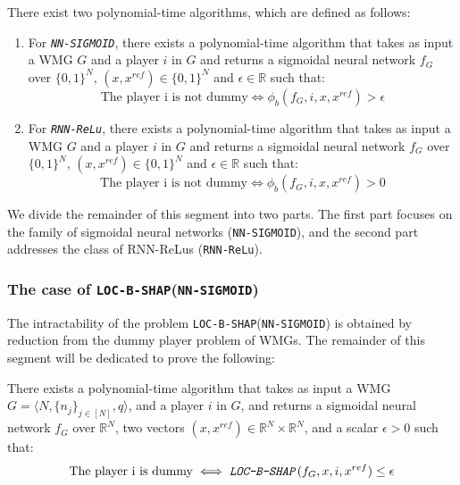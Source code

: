\begin{unumberedproposition} There exist two polynomial-time algorithms, which are defined as follows:
 \begin{enumerate}
        \item For \texttt{\emph{NN-SIGMOID}}, there exists a polynomial-time algorithm that takes as input a WMG $G$ and a player $i$ in $G$ and returns a sigmoidal neural network $f_{G}$ over $\{0,1\}^{N}$, $(x,x^{ref}) \in \{0,1\}^{N}$ and $\epsilon \in \mathbb{R}$ such that:
        $$\text{The player i is not dummy} \iff \phi_{b}(f_{G},i,x,x^{ref}) > \epsilon$$
        \item For \texttt{\emph{RNN-ReLu}}, there exists a polynomial-time algorithm that takes as input a WMG $G$ and a player $i$ in $G$ and returns a sigmoidal neural network $f_{G}$ over $\{0,1\}^{N}$, $(x,x^{ref}) \in \{0,1\}^{N}$ and $\epsilon \in \mathbb{R}$ such that:
         $$\text{The player i is not dummy} \iff \phi_{b}(f_{G},i,x,x^{ref}) > 0$$
    \end{enumerate}
\end{unumberedproposition}

We divide the remainder of this segment into two parts. The first part focuses on the family of sigmoidal neural networks (\texttt{NN-SIGMOID}), and the second part addresses the class of RNN-ReLus (\texttt{RNN-ReLu}).

\subsubsection{The case of \texttt{LOC-B-SHAP}(\texttt{NN-SIGMOID})}
The intractability of the problem \texttt{LOC-B-SHAP}(\texttt{NN-SIGMOID}) is obtained by reduction from the dummy player problem of WMGs. The remainder of this segment will be dedicated to prove the following:
\begin{proposition} \label{app:prop:bshapsigmoid}
    There exists a polynomial-time algorithm that takes as input a WMG $G = \langle N, \{n_{j}\}_{j \in [N]}, q \rangle$, and a player $i$ in $G$, and returns a sigmoidal neural network $f_{G}$ over $\mathbb{R}^{N}$, two vectors $(x, x^{ref}) \in \mathbb{R}^{N} \times \mathbb{R}^{N}$, and a scalar $\epsilon > 0$ such that:
    \begin{equation*}
     \text{The player i is dummy} \iff \texttt{\emph{LOC-B-SHAP}}(f_{G},x,i,x^{ref}) \leq \epsilon   
    \end{equation*}
     
\end{proposition}

